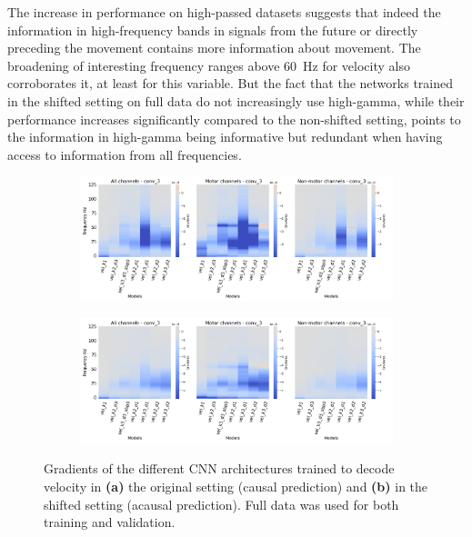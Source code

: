 \begin{enumerate}
    The increase in performance on high-passed datasets suggests that indeed the information in high-frequency bands in signals from the future or directly preceding the movement contains more information about movement.
    The broadening of interesting frequency ranges above 60~Hz for velocity also corroborates it, at least for this variable. 
    But the fact that the networks trained in the shifted setting on full data do not increasingly use high-gamma, while their performance increases significantly compared to the non-shifted setting, points to the information in high-gamma being informative but redundant when having access to information from all frequencies.
\end{enumerate}

\begin{figure}[!htpb]
\centering
\RawFloats
\begin{subfigure}[b]{\textwidth}
   \includegraphics[width=1\linewidth]{img/ch4/vel-conv-3-layer-grads}
   \caption{}
   \label{fig:vel-conv3-layer-grads}
\end{subfigure}

\begin{subfigure}[b]{\textwidth}
   \includegraphics[width=1\linewidth]{img/ch4/vel-conv-3-layer-grads-shifted}
   \caption{}
   \label{fig:vel-conv3-layer-grads-shifted}
\end{subfigure}
\caption[Velocity: non-shifted vs. shifted gradient, full data]{Gradients of the different CNN architectures trained to decode velocity in \textbf{(a)} the original setting (causal prediction) and \textbf{(b)} in the shifted setting (acausal prediction). Full data was used for both training and validation.}
\label{fig:vel-shifted-vs-non-shifted-grads}
\end{figure}

